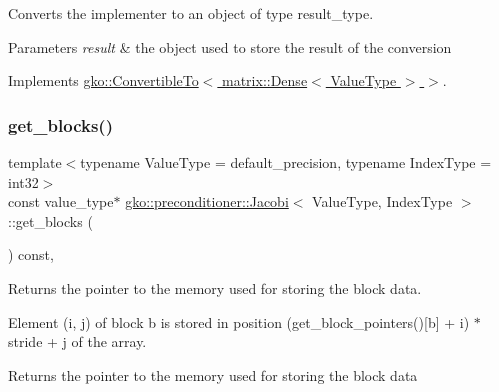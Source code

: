 Converts the implementer to an object of type result\+\_\+type. 


\begin{DoxyParams}{Parameters}
{\em result} & the object used to store the result of the conversion \\
\hline
\end{DoxyParams}


Implements \hyperlink{classgko_1_1ConvertibleTo_aa7f3420babcbed39ee15bc020bed4f7e}{gko\+::\+Convertible\+To$<$ matrix\+::\+Dense$<$ Value\+Type $>$ $>$}.

\mbox{\label{classgko_1_1preconditioner_1_1Jacobi_a1f3104ff10b00ff5faaf17a164400663}} 
\subsubsection{\texorpdfstring{get\+\_\+blocks()}{get\_blocks()}}
{\footnotesize\ttfamily template$<$typename Value\+Type  = default\+\_\+precision, typename Index\+Type  = int32$>$ \\
const value\+\_\+type$\ast$ \hyperlink{classgko_1_1preconditioner_1_1Jacobi}{gko\+::preconditioner\+::\+Jacobi}$<$ Value\+Type, Index\+Type $>$\+::get\+\_\+blocks (\begin{DoxyParamCaption}{ }\end{DoxyParamCaption}) const\hspace{0.3cm}{\ttfamily [inline]}, {\ttfamily [noexcept]}}



Returns the pointer to the memory used for storing the block data. 

Element ({\ttfamily i}, {\ttfamily j}) of block {\ttfamily b} is stored in position {\ttfamily (get\+\_\+block\+\_\+pointers()\mbox{[}b\mbox{]} + i) $\ast$ stride + j} of the array.

\begin{DoxyReturn}{Returns}
the pointer to the memory used for storing the block data 
\end{DoxyReturn}
\mbox{\label{classgko_1_1preconditioner_1_1Jacobi_ad4cef85a520076fefc0e911ab205cf12}} 
